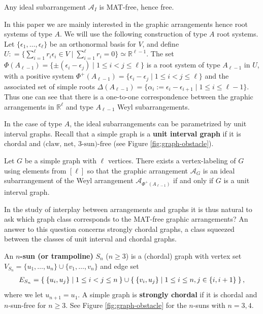 \documentclass[ALCO, Unicode,published]{cedram}
\newcommand{\R}{\mathbb{R}}
\newcommand{\A}{\mathcal{A}}
\begin{document}
\begin{theorem}
\label{thm:ideal-free}
Any ideal subarrangement $\A_{I}$ is MAT-free, hence free.
\end{theorem}

In this paper we are mainly interested in the graphic arrangements hence root systems of type $A$. 
We will use the following construction of type $A$ root systems.
Let $\{\epsilon_1, \ldots, \epsilon_{\ell}\}$ be an orthonormal basis for $V$, and define $U : = \{ \sum_{i=1}^{\ell} r_i\epsilon_i  \in V\mid \sum_{i=1}^{\ell} r_i=0\} \simeq \R^{\ell-1}$. 
 The set $\Phi(A_{\ell-1}) = \{\pm(\epsilon_i - \epsilon_j) \mid 1 \le i<j \le \ell\}$ 
is a root system of type $A_{\ell-1}$ in $U$, with a positive system
$
\Phi^+(A_{\ell-1}) =  \{ \epsilon_i-\epsilon_j \mid 1 \le i <  j \le \ell\}
$
 and the associated set of simple roots $\Delta(A_{\ell-1}) = \{\alpha_i:=\epsilon_i - \epsilon_{i+1} \mid 1 \le i  \le \ell-1\}$.
Thus one can see that there is a one-to-one correspondence between the graphic arrangements in $\R^\ell$ and type $A_{\ell-1}$ Weyl subarrangements.

In the case of type $A$, the ideal subarrangements can be parametrized by unit interval graphs. 
Recall that a simple graph is a \textbf{unit interval graph} if it is chordal and $\mbox{(claw, net, $3$-sun)-free}$ (see Figure \ref{fig:graph-obstacle}).

 \begin{theorem}
\label{thm:ideal-UI}
Let $G$ be a simple graph with $\ell$ vertices. 
There exists a vertex-labeling of $G$ using elements from $[\ell]$ so that the graphic arrangement $\A_G$ is an ideal subarrangement of the Weyl arrangement $\A_{\Phi^+(A_{\ell-1})}$ if and only if $G$ is a unit interval graph.
\end{theorem}

In the study of interplay between arrangements and graphs it is thus natural to ask which graph class corresponds to the MAT-free graphic arrangements? 
An answer to this question concerns strongly chordal graphs, a class squeezed between the classes of unit interval and chordal graphs.
\begin{definition}
\label{def:strongly-chordal}
An \textbf{$n$-sun (or trampoline)} $ S_{n} $ ($n \ge 3$) is a (chordal) graph with vertex set $V_{S_{n}} = \{u_{1}, \dots, u_{n}\} \cup \{v_{1}, \dots, v_{n}\} $ and edge set 
\begin{align*}
E_{S_{n}} = \Set{\{u_{i},u_{j}\} | 1 \leq i < j \leq n} \cup \Set{\{v_{i}, u_{j}\} | 1 \leq i \leq n, j \in \{i, i+1\}}, 
\end{align*}
where we let $ u_{n+1} = u_{1} $. 
 A simple graph is  \textbf{strongly chordal} if it is chordal and $n$-sun-free for $n\ge3$. 
 See Figure \ref{fig:graph-obstacle} for the $n$-suns with $n=3,4$.
\end{definition}
\end{document}

